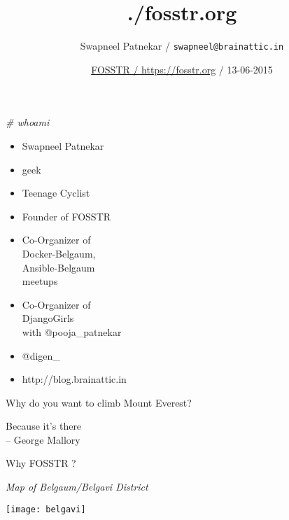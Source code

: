 \documentclass{beamer}
\author{Swapneel Patnekar / \texttt{swapneel@brainattic.in}}
\title{./fosstr.org}
\date{\href{https://fosstr.org/}{FOSSTR / https://fosstr.org} / 13-06-2015}
\begin{document}
\begin{frame}
  \titlepage
\end{frame}



\begin{frame}{\textit{\# whoami}}
\begin{itemize}
\item Swapneel Patnekar
\item geek
\item Teenage Cyclist
\item Founder of FOSSTR
\item Co-Organizer of \\Docker-Belgaum, \\Ansible-Belgaum \\meetups
\item Co-Organizer of \\DjangoGirls \\with @pooja\_patnekar
\item @digen\_
\item http://blog.brainattic.in
\end{itemize}
\end{frame}




\begin{frame}{}
\begin{center}
\large{Why do you want to climb Mount Everest?}\\
\end{center}
\end{frame}



\begin{frame}{}
\begin{center}
\large{Because it's there}\\
\hfill \small{-- George Mallory}
\end{center}
\end{frame}




\begin{frame}{}
\begin{center}
Why FOSSTR ? 
\end{center}
\end{frame}

\begin{frame}{\textit{Map of Belgaum/Belgavi District}}
\begin{center}
\texttt{[image: belgavi]}
\end{center}
\end{frame}
\end{document}
